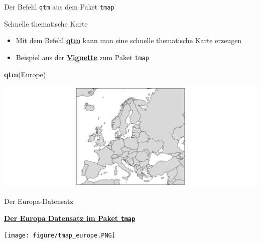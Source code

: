 \documentclass[ignorenonframetext,]{beamer}
\newenvironment{Shaded}{\begin{snugshade}}{\end{snugshade}}
\newcommand{\KeywordTok}[1]{\textcolor[rgb]{0.13,0.29,0.53}{\textbf{#1}}}
\newcommand{\NormalTok}[1]{#1}
\begin{document}
\begin{frame}[fragile]{Der Befehl \texttt{qtm} aus dem Paket
\texttt{tmap}}

\begin{block}{Schnelle thematische Karte}

\begin{itemize}
\item
  Mit dem Befehl
  \href{https://cran.r-project.org/web/packages/tmap/vignettes/tmap-nutshell.html}{\textbf{qtm}}
  kann man eine schnelle thematische Karte erzeugen
\item
  Beispiel aus der
  \href{https://cran.r-project.org/web/packages/tmap/vignettes/tmap-nutshell.html}{\textbf{Vignette}}
  zum Paket \texttt{tmap}
\end{itemize}

\begin{Shaded}
\begin{Highlighting}[]
\KeywordTok{qtm}\NormalTok{(Europe)}
\end{Highlighting}
\end{Shaded}

\includegraphics{tmap_files/figure-beamer/unnamed-chunk-5-1.pdf}

\end{block}

\end{frame}

\begin{frame}[fragile]{Der Europa-Datensatz}

\begin{block}{\href{http://rpubs.com/Japhilko82/tmap_europe_dataset}{\textbf{Der
Europa Datensatz im Paket \texttt{tmap}}}}

\texttt{[image: figure/tmap\_europe.PNG]}

\end{block}

\end{frame}
\end{document}
